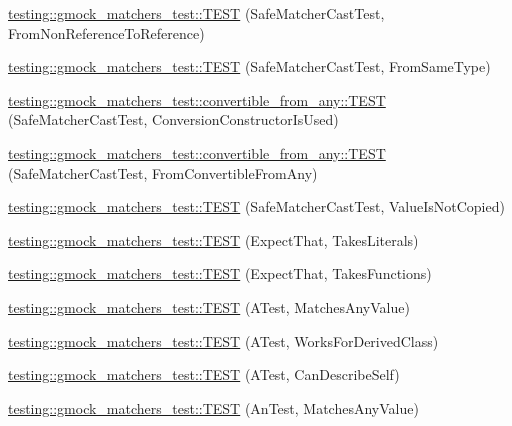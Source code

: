 \begin{DoxyCompactItemize}
\item 
\mbox{\hyperlink{namespacetesting_1_1gmock__matchers__test_a362ce5b2b395dfd6363e4d80b49951f1}{testing\+::gmock\+\_\+matchers\+\_\+test\+::\+T\+E\+ST}} (Safe\+Matcher\+Cast\+Test, From\+Non\+Reference\+To\+Reference)
\item 
\mbox{\hyperlink{namespacetesting_1_1gmock__matchers__test_a9fc149b429176a45e45267132ae901bd}{testing\+::gmock\+\_\+matchers\+\_\+test\+::\+T\+E\+ST}} (Safe\+Matcher\+Cast\+Test, From\+Same\+Type)
\item 
\mbox{\hyperlink{namespacetesting_1_1gmock__matchers__test_1_1convertible__from__any_aca99c4625c546ea8390dcd2244626a43}{testing\+::gmock\+\_\+matchers\+\_\+test\+::convertible\+\_\+from\+\_\+any\+::\+T\+E\+ST}} (Safe\+Matcher\+Cast\+Test, Conversion\+Constructor\+Is\+Used)
\item 
\mbox{\hyperlink{namespacetesting_1_1gmock__matchers__test_1_1convertible__from__any_a97a2ef4bbe1a2702e4bf79c12b1b9e9a}{testing\+::gmock\+\_\+matchers\+\_\+test\+::convertible\+\_\+from\+\_\+any\+::\+T\+E\+ST}} (Safe\+Matcher\+Cast\+Test, From\+Convertible\+From\+Any)
\item 
\mbox{\hyperlink{namespacetesting_1_1gmock__matchers__test_ac82f8355af7a1e6ba3b67ba8423a1d73}{testing\+::gmock\+\_\+matchers\+\_\+test\+::\+T\+E\+ST}} (Safe\+Matcher\+Cast\+Test, Value\+Is\+Not\+Copied)
\item 
\mbox{\hyperlink{namespacetesting_1_1gmock__matchers__test_a7672c72f955b937542acd87d18dd7ea6}{testing\+::gmock\+\_\+matchers\+\_\+test\+::\+T\+E\+ST}} (Expect\+That, Takes\+Literals)
\item 
\mbox{\hyperlink{namespacetesting_1_1gmock__matchers__test_aafaf5273bd3d8ba273a5dd243d3a52ba}{testing\+::gmock\+\_\+matchers\+\_\+test\+::\+T\+E\+ST}} (Expect\+That, Takes\+Functions)
\item 
\mbox{\hyperlink{namespacetesting_1_1gmock__matchers__test_af15da53cdc65283b8ca688a03801fd12}{testing\+::gmock\+\_\+matchers\+\_\+test\+::\+T\+E\+ST}} (A\+Test, Matches\+Any\+Value)
\item 
\mbox{\hyperlink{namespacetesting_1_1gmock__matchers__test_a2b2dfb85d18883b07f7d13d21abee2fc}{testing\+::gmock\+\_\+matchers\+\_\+test\+::\+T\+E\+ST}} (A\+Test, Works\+For\+Derived\+Class)
\item 
\mbox{\hyperlink{namespacetesting_1_1gmock__matchers__test_a24432bc861bee430fb8ac1a4e5463ecf}{testing\+::gmock\+\_\+matchers\+\_\+test\+::\+T\+E\+ST}} (A\+Test, Can\+Describe\+Self)
\item 
\mbox{\hyperlink{namespacetesting_1_1gmock__matchers__test_a15bf6771986d1e9f675f29861f7551c1}{testing\+::gmock\+\_\+matchers\+\_\+test\+::\+T\+E\+ST}} (An\+Test, Matches\+Any\+Value)

\end{DoxyCompactItemize}
